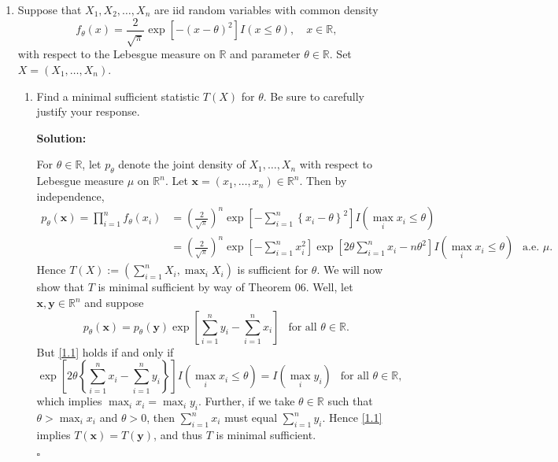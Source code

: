 \documentclass[12pt]{article}
\newcounter{ProofCounter}
\newenvironment{Solution}{\stepcounter{ProofCounter}\textbf{Solution:}}{\hfill$\square$}
\def\t{\theta}
\begin{document}
\begin{enumerate}[leftmargin=0cm, itemindent=0cm]





\item Suppose that $X_1,X_2,\ldots,X_n$ are iid random variables with common density
\[
f_\theta(x) = \frac{2}{\sqrt{\pi}} \exp\left[-(x-\theta)^2\right] I(x \leq \theta),\quad x\in\mathbb{R},
\]
with respect to the Lebesgue measure on $\mathbb{R}$ and parameter $\theta \in \mathbb{R}$.
Set $X=(X_1,\ldots,X_n)$.

\begin{enumerate}[leftmargin=0cm, itemindent=0cm]
\item Find a minimal sufficient statistic $T(X)$ for $\theta$.  Be sure to carefully justify your response.

  \begin{Solution}

  For $\theta \in \mathbb{R}$, let $p_{\theta}$ denote the joint density of $X_1, \dots , X_n$ with respect to Lebesgue measure $\mu$ on
  $\mathbb{R}^n$.
  Let $\bm{x} = (x_1, \dots, x_n) \in \mathbb{R}^{n}$. Then by independence,
  \begin{align*}
    p_{\theta}(\bm{x}) = \prod_{i=1}^{n}f_{\theta}(x_i) & = \left( \frac{2}{\sqrt{\pi}} \right)^{n}\exp\left[ -\sum_{i=1}^{n}\left\{ x_i - \theta
    \right\}^2 \right]I(\max_i x_i \leq \t) \\
    & = \left( \frac{2}{\sqrt{\pi}} \right)^{n} \exp\left[ -\sum_{i=1}^{n}x_i^2 \right]\exp\left[ 2\theta\sum_{i=1}^{n}x_i - n\theta^2 \right]I(\max_i
    x_i \leq \t) \ \ \text{ a.e. } \mu.
  \end{align*}
  Hence $T(X) := \left( \sum_{i=1}^{n}X_i, \max_i X_i \right)$ is sufficient for $\theta$. We will now show that $T$ is minimal sufficient by way
  of Theorem 06. Well, let $\bm{x}, \bm{y} \in \mathbb{R}^{n}$ and suppose 
  \begin{equation}
    p_{\theta}(\bm{x}) = p_{\theta}(\bm{y}) \exp\left[ \sum_{i=1}^{n}y_i - \sum_{i=1}^{n}x_i \right] \ \ \text{ for all } \theta \in \mathbb{R}.
    \label{1.1}
  \end{equation}
  But \eqref{1.1} holds if and only if
  \[
    \exp\left[ 2\theta\left\{ \sum_{i=1}^{n}x_i - \sum_{i=1}^{n}y_i \right\} \right]I(\max_i x_i \leq \theta) = I(\max_i y_i) \ \ \text{ for all } \theta
    \in \mathbb{R},
  \]
  which implies $\max_i x_i = \max_i y_i$. Further, if we take $\theta \in \mathbb{R}$ such that $\theta > \max_i x_i$ and $\theta > 0$, then $\sum_{i=1}^{n}x_i$ must equal $\sum_{i=1}^{n}y_i$.
  Hence \eqref{1.1} implies $T(\bm{x}) = T(\bm{y})$, and thus $T$ is minimal sufficient.


\end{Solution}
\end{enumerate}
\end{enumerate}
\end{document}
